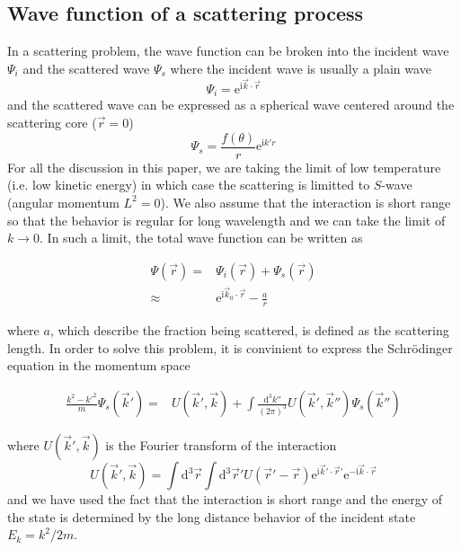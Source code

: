 \documentclass[aps,twocolumn,secnumarabic,balancelastpage,amsmath,amssymb,nofootinbib]{revtex4}
\newcommand{\ud}{\mathrm{d}}
\newcommand{\ue}{\mathrm{e}}
\newcommand{\ui}{\mathrm{i}}
\newcommand{\eqar}[1]
{
  \begin{align*}
    #1
  \end{align*}
}
\newcommand{\paren}[1]{{\left({#1}\right)}}
\begin{document}
\subsection{Wave function of a scattering process}
In a scattering problem, the wave function can be broken into the incident wave $\Psi_i$ and the scattered wave $\Psi_s$ where the incident wave is usually a plain wave
\[\Psi_i=\ue^{\ui\vec k\cdot\vec r}\]
and the scattered wave can be expressed as a spherical wave centered around the scattering core ($\vec r=0$)
\[\Psi_s=\frac{f\paren{\theta}}{r}\ue^{\ui k'r}\]
For all the discussion in this paper, we are taking the limit of low temperature (i.e. low kinetic energy) in which case the scattering is limitted to $S$-wave (angular momentum $L^2=0$). We also assume that the interaction is short range so that the behavior is regular for long wavelength and we can take the limit of $k\rightarrow0$. In such a limit, the total wave function can be written as
\eqar{
  \Psi\paren{\vec r}=&\Psi_i\paren{\vec r}+\Psi_s\paren{\vec r}\\
  \approx&\ue^{\ui \vec k_0\cdot \vec r}-\frac{a}{r}
}
where $a$, which describe the fraction being scattered, is defined as the scattering length. In order to solve this problem, it is convinient to express the Schr\"odinger equation in the momentum space
\eqar{
  \frac{k^2-k'^2}{m}\Psi_{s}\paren{\vec k'}=&U\paren{\vec k', \vec k}+\int\frac{\ud^3 k''}{\paren{2\pi}^3}U\paren{\vec k', \vec k''}\Psi_s\paren{\vec k''}
}
where $U\paren{\vec k', \vec k}$ is the Fourier transform of the interaction
\[ U(\vec k', \vec k)=\int\ud^3\vec r\int\ud^3\vec r'U\paren{\vec r'-\vec r}\ue^{\ui\vec k'\cdot\vec r'}\ue^{-\ui\vec k\cdot\vec r}\]
and we have used the fact that the interaction is short range and the energy of the state is determined by the long distance behavior of the incident state $E_k=k^2/2m$.
\end{document}
